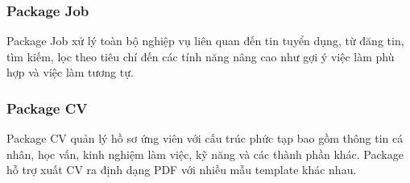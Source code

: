 \subsubsection{Package Job}

Package Job xử lý toàn bộ nghiệp vụ liên quan đến tin tuyển dụng, từ đăng tin, tìm kiếm, lọc theo tiêu chí đến các tính năng nâng cao như gợi ý việc làm phù hợp và việc làm tương tự.

%
%
%
%
%

\subsubsection{Package CV}

Package CV quản lý hồ sơ ứng viên với cấu trúc phức tạp bao gồm thông tin cá nhân, học vấn, kinh nghiệm làm việc, kỹ năng và các thành phần khác. Package hỗ trợ xuất CV ra định dạng PDF với nhiều mẫu template khác nhau.

